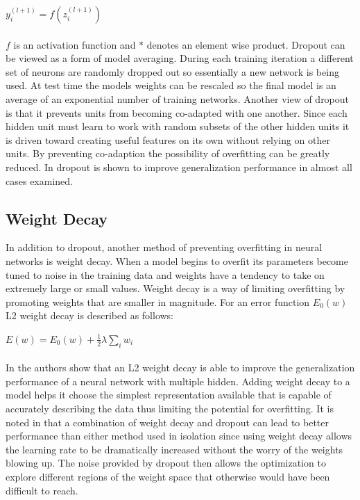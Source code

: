 \documentclass[12pt,letterpaper]{article}
\begin{document}
$y_i^{(l + 1)} = f(z_i^{(l + 1)})$
\\
\\
$f$ is an activation function and $*$ denotes an element wise product.  Dropout can be viewed as a form of model averaging.  During each training iteration a different set of neurons are randomly dropped out so essentially a new network is being used.  At test time the models weights can be rescaled so the final model is an average of an exponential number of training networks.  Another view of dropout is that it prevents units from becoming co-adapted with one another.  Since each hidden unit must learn to work with random subsets of the other hidden units it is driven toward creating useful features on its own without relying on other units.  By preventing co-adaption the possibility of overfitting can be greatly reduced.  In \cite{Srivastava:2014:DSW:2627435.2670313} dropout is shown to improve generalization performance in almost all cases examined.

\subsection{Weight Decay}
In addition to dropout, another method of preventing overfitting in neural networks is weight decay.  When a model begins to overfit its parameters become tuned to noise in the training data and weights have a tendency to take on extremely large or small values.  Weight decay is a way of limiting overfitting by promoting weights that are smaller in magnitude. For an error function $E_0(w)$ L2 weight decay is described as follows:

$E(w) = E_0(w) + \frac{1}{2} \lambda \sum_i w_i$
\\
\\
In \cite{Krogh92asimple} the authors show that an L2 weight decay is able to improve the generalization performance of a neural network with multiple hidden.  Adding weight decay to a model helps it choose the simplest representation available that is capable of accurately describing the data thus limiting the potential for overfitting.  It is noted in \cite{Srivastava:2014:DSW:2627435.2670313} that a combination of weight decay and dropout can lead to better performance than either method used in isolation since using weight decay allows the learning rate to be dramatically increased without the worry of the weights blowing up.  The noise provided by dropout then allows the optimization to explore different regions of the weight space that otherwise would have been difficult to reach.
\end{document}
